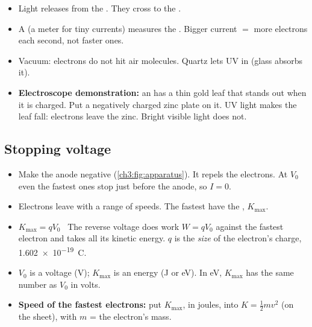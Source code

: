 \begin{sidebyside}[0.62]
  \label{ch3:fig:apparatus}
\nextside
  \begin{itemize}
    \item Light releases  from the . They cross to
          the .
    \item A  (a meter for tiny currents) measures the
          . Bigger current $=$ more electrons each second, not
          faster ones.
    \item Vacuum: electrons do not hit air molecules. Quartz lets UV in (glass
          absorbs it).
  \end{itemize}
\end{sidebyside}

\begin{itemize}
  \item \textbf{Electroscope demonstration:} an  has a thin gold leaf
        that stands out when it is charged. Put a negatively charged zinc plate on it. UV
        light makes the leaf fall: electrons leave the zinc. Bright visible light does not.
\end{itemize}

\subsection{Stopping voltage}

\begin{itemize}
  \item Make the anode negative (\cref{ch3:fig:apparatus}). It repels the electrons.
        At $V_0$ even the fastest ones stop just before the anode, so $I = 0$.
  \item Electrons leave with a range of speeds. The fastest have the
        , $K_\mathrm{max}$.
  \item $K_\mathrm{max} = qV_0$ \ The reverse voltage does work $W = qV_0$ against the fastest electron and takes
        all its kinetic energy. $q$ is the \emph{size} of the electron's charge,
        \qty{1.602e-19}{C}.
  \item $V_0$ is a voltage (V); $K_\mathrm{max}$ is an energy (J or eV). In eV,
        $K_\mathrm{max}$ has the same number as $V_0$ in volts.
  \item \textbf{Speed of the fastest electrons:} put $K_\mathrm{max}$, in joules, into
        $K = \frac{1}{2}mv^2$ (on the sheet), with $m$ = the electron's mass.
\end{itemize}

